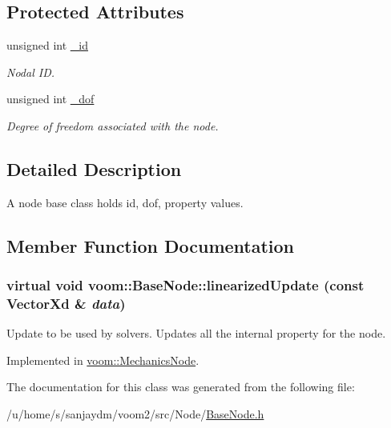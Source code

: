 \subsection*{Protected Attributes}
\begin{DoxyCompactItemize}
\item 
\hypertarget{classvoom_1_1_base_node_a8681fcdb44184fa22d54c14403b0716a}{
unsigned int \hyperlink{classvoom_1_1_base_node_a8681fcdb44184fa22d54c14403b0716a}{\_\-id}}
\label{classvoom_1_1_base_node_a8681fcdb44184fa22d54c14403b0716a}

\begin{DoxyCompactList}\small\item\em Nodal ID. \item\end{DoxyCompactList}\item 
\hypertarget{classvoom_1_1_base_node_ac0bca38f9ad3d54960ec7d0776ec71c4}{
unsigned int \hyperlink{classvoom_1_1_base_node_ac0bca38f9ad3d54960ec7d0776ec71c4}{\_\-dof}}
\label{classvoom_1_1_base_node_ac0bca38f9ad3d54960ec7d0776ec71c4}

\begin{DoxyCompactList}\small\item\em Degree of freedom associated with the node. \item\end{DoxyCompactList}\end{DoxyCompactItemize}


\subsection{Detailed Description}
A node base class holds id, dof, property values. 

\subsection{Member Function Documentation}
\hypertarget{classvoom_1_1_base_node_a27a440cc623e936472f5052f2731d32f}{
\subsubsection[{linearizedUpdate}]{\setlength{\rightskip}{0pt plus 5cm}virtual void voom::BaseNode::linearizedUpdate (const VectorXd \& {\em data})}}
\label{classvoom_1_1_base_node_a27a440cc623e936472f5052f2731d32f}
Update to be used by solvers. Updates all the internal property for the node. 

Implemented in \hyperlink{classvoom_1_1_mechanics_node_aa533aac405cd9f4b8b024ad070f18aff}{voom::MechanicsNode}.

The documentation for this class was generated from the following file:\begin{DoxyCompactItemize}
\item 
/u/home/s/sanjaydm/voom2/src/Node/\hyperlink{_base_node_8h}{BaseNode.h}\end{DoxyCompactItemize}
